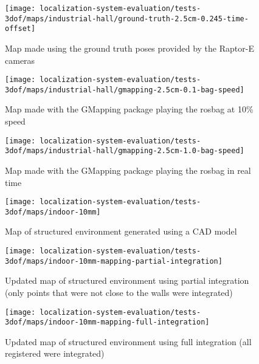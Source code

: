 \begin{figure}[H]
	\centering
	\texttt{[image: localization-system-evaluation/tests-3dof/maps/industrial-hall/ground-truth-2.5cm-0.245-time-offset]}
	\caption{Map made using the ground truth poses provided by the Raptor-E cameras}
	\label{fig:localization-system-evaluation_ground-truth-2.5cm-0.245-time-offset}
\end{figure}


\begin{figure}[H]
	\centering
	\texttt{[image: localization-system-evaluation/tests-3dof/maps/industrial-hall/gmapping-2.5cm-0.1-bag-speed]}
	\caption{Map made with the GMapping package playing the rosbag at 10\% speed}
	\label{fig:localization-system-evaluation_gmapping-2.5cm-0.1-bag-speed}
\end{figure}

\begin{figure}[H]
	\centering
	\texttt{[image: localization-system-evaluation/tests-3dof/maps/industrial-hall/gmapping-2.5cm-1.0-bag-speed]}
	\caption{Map made with the GMapping package playing the rosbag in real time}
	\label{fig:localization-system-evaluation_gmapping-2.5cm-1.0-bag-speed}
\end{figure}


\begin{figure}[H]
	\centering
	\texttt{[image: localization-system-evaluation/tests-3dof/maps/indoor-10mm]}
	\caption{Map of structured environment generated using a CAD model}
	\label{fig:localization-system-evaluation_indoor-10mm}
\end{figure}

\begin{figure}[H]
	\centering
	\texttt{[image: localization-system-evaluation/tests-3dof/maps/indoor-10mm-mapping-partial-integration]}
	\caption{Updated map of structured environment using partial integration (only points that were not close to the walls were integrated)}
	\label{fig:localization-system-evaluation_indoor-10mm-mapping-partial-integration}
\end{figure}

\begin{figure}[H]
	\centering
	\texttt{[image: localization-system-evaluation/tests-3dof/maps/indoor-10mm-mapping-full-integration]}
	\caption{Updated map of structured environment using full integration (all registered were integrated)}
	\label{fig:localization-system-evaluation_indoor-10mm-mapping-full-integration}
\end{figure}

